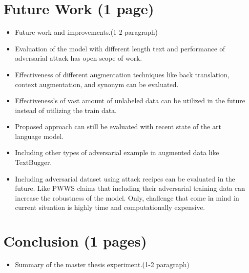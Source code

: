 \documentclass[%
	BCOR=8mm, %
	DIV=12, 
	toc=bibliography, %
	toc=listof, %
	oneside, %
	egregdoesnotlikesansseriftitles, %
	]{scrbook}
\begin{document}
\section{Future Work (1 page)}
\begin{itemize}
\item Future work and improvements.(1-2 paragraph)
\item Evaluation of the model with different length text and performance of adversarial attack has open scope of work. 
\item Effectiveness of different augmentation techniques like back translation, context augmentation, and synonym can be evaluated. 
\item Effectiveness's of vast amount of unlabeled data can be utilized in the future instead of utilizing the train data.
\item Proposed approach can still be evaluated with recent state of the art language model.
\item Including other types of adversarial example in augmented data like TextBugger.
\item Including adversarial dataset using attack recipes can be evaluated in the future. Like PWWS claims that including their adversarial training data can increase the robustness of the model. Only, challenge that come in mind in current situation is highly time and computationally expensive. 
\end{itemize}


\section{Conclusion (1 pages)}
\begin{itemize}
\item Summary of the master thesis experiment.(1-2 paragraph)
\end{itemize}










\end{document}
